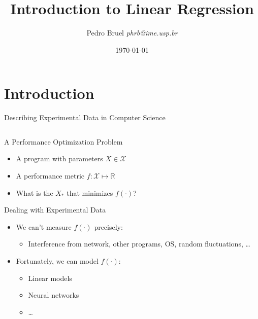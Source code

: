 \documentclass[10pt, compress, aspectratio=169, xcolor={table,usenames,dvipsnames}]{beamer}
\author{\footnotesize Pedro Bruel \newline \scriptsize \emph{phrb@ime.usp.br}}
\date{\scriptsize \today}
\title{Introduction to Linear Regression}
\begin{document}
\maketitle

\section{Introduction}
\label{sec:orgfa2e2a7}
\begin{frame}[label={sec:org3bdbb34}]{Describing Experimental Data in Computer Science}
\begin{columns}
\begin{column}{0.5\columnwidth}
\begin{block}{A Performance Optimization Problem}
\begin{itemize}
\item A \alert{program} with \alert{parameters} \(X \in \mathcal{X}\)
\item A \alert{performance metric} \(f: \mathcal{X} \mapsto \mathbb{R}\)
\item What is the \(X_*\) that \alert{minimizes} \(f(\cdot)\)?
\end{itemize}

\begin{block}{Dealing with Experimental Data}
\begin{itemize}
\item We can't measure \(f(\cdot)\) \alert{precisely}:
\begin{itemize}
\item Interference from network, other programs, OS, random fluctuations, \dots{}
\end{itemize}
\item Fortunately, we can \alert{model} \(f(\cdot)\):
\begin{itemize}
\item \alert{Linear models}
\item Neural networks
\item \dots{}
\end{itemize}
\end{itemize}
\end{block}
\end{block}
\end{column}


\end{columns}
\end{frame}
\end{document}
